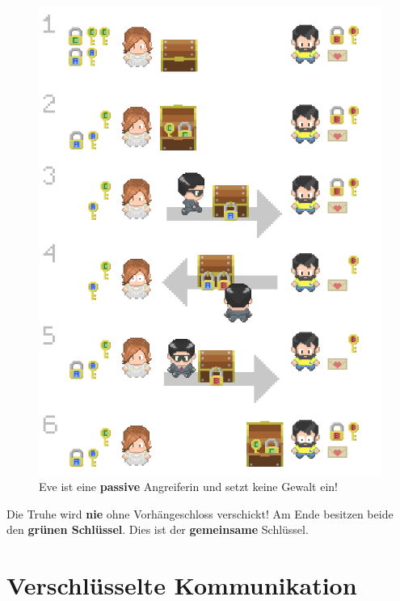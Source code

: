 \begin{figure}[htb]
	\centering
	\includegraphics[scale=0.36]{schluesselverteilung_truhe_1}
	\caption{Eve ist eine \textbf{passive} Angreiferin und setzt keine Gewalt ein!}
	\label{figure-schluesselverteilung-truhe}
\end{figure}

\vspace{-0.25cm}

\begin{important}
	Die Truhe wird \textbf{nie} ohne Vorhängeschloss verschickt! Am Ende besitzen beide den \textbf{grünen Schlüssel}. Dies ist der \textbf{gemeinsame} Schlüssel.
\end{important}

\section{Verschlüsselte Kommunikation}

